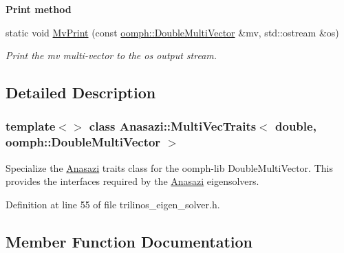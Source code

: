 \begin{Indent}\textbf{ Print method}\par
\begin{DoxyCompactItemize}
\item 
static void \hyperlink{classAnasazi_1_1MultiVecTraits_3_01double_00_01oomph_1_1DoubleMultiVector_01_4_a52dc632ffd66eb35ad481c6d36d71960}{Mv\+Print} (const \hyperlink{classoomph_1_1DoubleMultiVector}{oomph\+::\+Double\+Multi\+Vector} \&mv, std\+::ostream \&os)
\begin{DoxyCompactList}\small\item\em Print the {\ttfamily mv} multi-\/vector to the {\ttfamily os} output stream. \end{DoxyCompactList}\end{DoxyCompactItemize}
\end{Indent}


\subsection{Detailed Description}
\subsubsection*{template$<$$>$\newline
class Anasazi\+::\+Multi\+Vec\+Traits$<$ double, oomph\+::\+Double\+Multi\+Vector $>$}

Specialize the \hyperlink{namespaceAnasazi}{Anasazi} traits class for the oomph-\/lib Double\+Multi\+Vector. This provides the interfaces required by the \hyperlink{namespaceAnasazi}{Anasazi} eigensolvers. 

Definition at line 55 of file trilinos\+\_\+eigen\+\_\+solver.\+h.



\subsection{Member Function Documentation}
\mbox{\label{classAnasazi_1_1MultiVecTraits_3_01double_00_01oomph_1_1DoubleMultiVector_01_4_af7888014d05b442a4d908974bba3d6c5}} 
